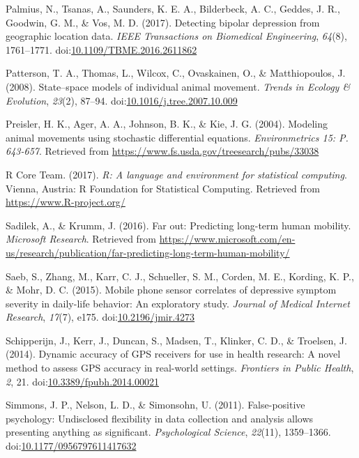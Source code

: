 \documentclass[man]{apa6}
\theoremstyle{definition}
\theoremstyle{definition}
\theoremstyle{definition}
\theoremstyle{remark}
\begin{document}
\hypertarget{ref-palmius_detecting_2017}{}
Palmius, N., Tsanas, A., Saunders, K. E. A., Bilderbeck, A. C., Geddes,
J. R., Goodwin, G. M., \& Vos, M. D. (2017). Detecting bipolar
depression from geographic location data. \emph{IEEE Transactions on
Biomedical Engineering}, \emph{64}(8), 1761--1771.
doi:\href{https://doi.org/10.1109/TBME.2016.2611862}{10.1109/TBME.2016.2611862}

\hypertarget{ref-patterson_statespace_2008}{}
Patterson, T. A., Thomas, L., Wilcox, C., Ovaskainen, O., \&
Matthiopoulos, J. (2008). State--space models of individual animal
movement. \emph{Trends in Ecology \& Evolution}, \emph{23}(2), 87--94.
doi:\href{https://doi.org/10.1016/j.tree.2007.10.009}{10.1016/j.tree.2007.10.009}

\hypertarget{ref-preisler_modeling_2004}{}
Preisler, H. K., Ager, A. A., Johnson, B. K., \& Kie, J. G. (2004).
Modeling animal movements using stochastic differential equations.
\emph{Environmetrics 15: P. 643-657}. Retrieved from
\url{https://www.fs.usda.gov/treesearch/pubs/33038}

\hypertarget{ref-R-base}{}
R Core Team. (2017). \emph{R: A language and environment for statistical
computing}. Vienna, Austria: R Foundation for Statistical Computing.
Retrieved from \url{https://www.R-project.org/}

\hypertarget{ref-sadilek_far_2016}{}
Sadilek, A., \& Krumm, J. (2016). Far out: Predicting long-term human
mobility. \emph{Microsoft Research}. Retrieved from
\url{https://www.microsoft.com/en-us/research/publication/far-predicting-long-term-human-mobility/}

\hypertarget{ref-saeb_mobile_2015}{}
Saeb, S., Zhang, M., Karr, C. J., Schueller, S. M., Corden, M. E.,
Kording, K. P., \& Mohr, D. C. (2015). Mobile phone sensor correlates of
depressive symptom severity in daily-life behavior: An exploratory
study. \emph{Journal of Medical Internet Research}, \emph{17}(7), e175.
doi:\href{https://doi.org/10.2196/jmir.4273}{10.2196/jmir.4273}

\hypertarget{ref-schipperijn_dynamic_2014}{}
Schipperijn, J., Kerr, J., Duncan, S., Madsen, T., Klinker, C. D., \&
Troelsen, J. (2014). Dynamic accuracy of GPS receivers for use in health
research: A novel method to assess GPS accuracy in real-world settings.
\emph{Frontiers in Public Health}, \emph{2}, 21.
doi:\href{https://doi.org/10.3389/fpubh.2014.00021}{10.3389/fpubh.2014.00021}

\hypertarget{ref-simmons_false-positive_2011}{}
Simmons, J. P., Nelson, L. D., \& Simonsohn, U. (2011). False-positive
psychology: Undisclosed flexibility in data collection and analysis
allows presenting anything as significant. \emph{Psychological Science},
\emph{22}(11), 1359--1366.
doi:\href{https://doi.org/10.1177/0956797611417632}{10.1177/0956797611417632}
\end{document}
